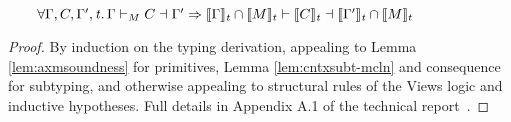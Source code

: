\begin{lemma}
  \label{lemma:embedw}
\\\mbox{$\qquad
\forall\Gamma,C,\Gamma',\mathit{t}\ldotp\Gamma\vdash_M C\dashv \Gamma' \Rightarrow
\llbracket\Gamma\rrbracket_\mathit{t}\cap\llbracket{M}\rrbracket_t\vdash \llbracket C\rrbracket_\mathit{t}\dashv\llbracket\Gamma'\rrbracket_\mathit{t}\cap\llbracket{M}\rrbracket_t
$}
\end{lemma}
\begin{proof}
By induction on the typing derivation, appealing to Lemma \ref{lem:axmsoundness} for primitives, Lemma \ref{lem:cntxsubt-mcln} and consequence for subtyping, and otherwise appealing to structural rules of the Views logic and inductive hypotheses.
Full details in Appendix A.1 of the technical report~\cite{isotek}. %
  \end{proof}

